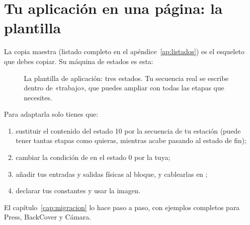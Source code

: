 \section{Tu aplicación en una página: la plantilla}
La copia maestra  (listado completo en el apéndice~\ref{ap:listados}) es el esqueleto que debes copiar. Su máquina de estados es esta:

\begin{figure}[ht]
\centering
{}
\caption{La plantilla de aplicación: tres estados. Tu secuencia real se escribe dentro de «trabajo», que puedes ampliar con todas las etapas que necesites.}
\end{figure}

Para adaptarla solo tienes que:
\begin{enumerate}
\item sustituir el contenido del estado 10 por la secuencia de tu estación (puede tener tantas etapas como quieras, mientras acabe pasando al estado de fin);
\item cambiar la condición de  en el estado 0 por la tuya;
\item añadir tus entradas y salidas físicas al bloque, y cablearlas en ;
\item declarar tus constantes  y usar la imagen.
\end{enumerate}
El capítulo~\ref{cap:migracion} lo hace paso a paso, con ejemplos completos para Press, BackCover y Cámara.

